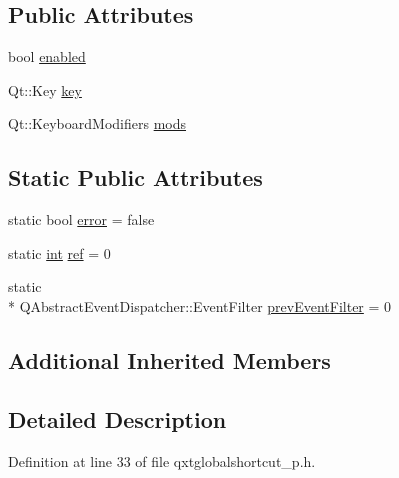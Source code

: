 \subsection*{Public Attributes}
\begin{DoxyCompactItemize}
\item 
bool \hyperlink{class_qxt_global_shortcut_private_a1a1c744926f0825297e286a3808cfc52}{enabled}
\item 
Qt\-::\-Key \hyperlink{class_qxt_global_shortcut_private_ab33624dd2ebefa854906fa3ab7298d99}{key}
\item 
Qt\-::\-Keyboard\-Modifiers \hyperlink{class_qxt_global_shortcut_private_a2913f92970c0e0808d3c8089ac1d170f}{mods}
\end{DoxyCompactItemize}
\subsection*{Static Public Attributes}
\begin{DoxyCompactItemize}
\item 
static bool \hyperlink{class_qxt_global_shortcut_private_ad0428909242656145314176d35cad1ff}{error} = false
\item 
static \hyperlink{ioapi_8h_a787fa3cf048117ba7123753c1e74fcd6}{int} \hyperlink{class_qxt_global_shortcut_private_a94cfab1e3a0d9aa84c5c13245612efa8}{ref} = 0
\item 
static \\*
Q\-Abstract\-Event\-Dispatcher\-::\-Event\-Filter \hyperlink{class_qxt_global_shortcut_private_ac0bb8c114af2d2eea85480856921dfc2}{prev\-Event\-Filter} = 0
\end{DoxyCompactItemize}
\subsection*{Additional Inherited Members}


\subsection{Detailed Description}


Definition at line 33 of file qxtglobalshortcut\-\_\-p.\-h.



